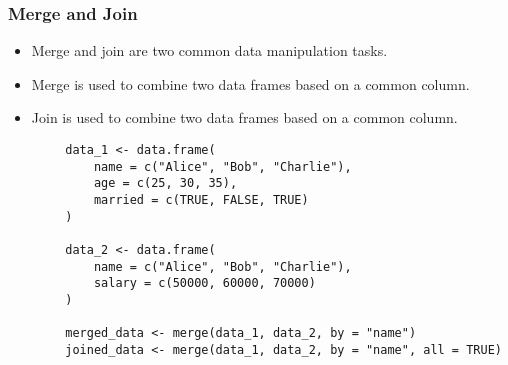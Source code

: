 \documentclass[serif, 9pt, aspectratio=32]{beamer}
\begin{document}
\begin{frame}
    \centering
    \frametitle{Merge and Join}
    \begin{itemize}
        \setlength{\itemsep}{2em}
        \item Merge and join are two common data manipulation tasks.
        \item Merge is used to combine two data frames based on a common column.
        \item Join is used to combine two data frames based on a common column.
    \end{itemize}
\end{frame}

\begin{frame}[fragile]
    \begin{lstlisting}
        data_1 <- data.frame(
            name = c("Alice", "Bob", "Charlie"),
            age = c(25, 30, 35),
            married = c(TRUE, FALSE, TRUE)
        )

        data_2 <- data.frame(
            name = c("Alice", "Bob", "Charlie"),
            salary = c(50000, 60000, 70000)
        )

        merged_data <- merge(data_1, data_2, by = "name")
        joined_data <- merge(data_1, data_2, by = "name", all = TRUE)
    \end{lstlisting}
\end{frame}
\end{document}
